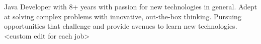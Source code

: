 
\par{
Java Developer with 8+ years with passion for new technologies in general. Adept at solving complex problems with innovative, out-the-box thinking.  Pursuing opportunities that challenge and provide avenues to learn new technologies. <custom  edit for each job>}